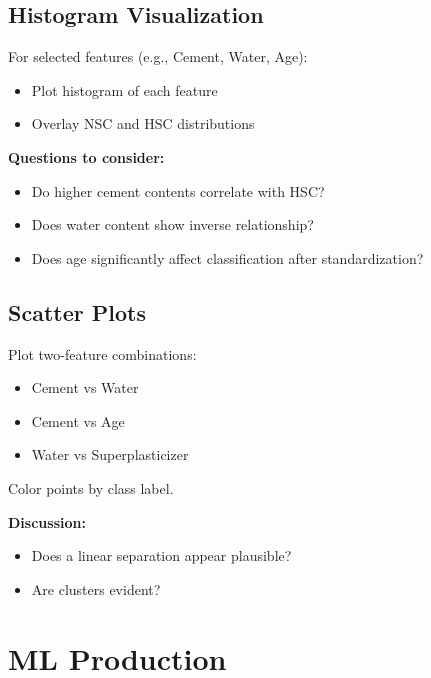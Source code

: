 \documentclass[12pt]{article}
\begin{document}
\subsection*{Histogram Visualization}

For selected features (e.g., Cement, Water, Age):

\begin{itemize}
    \item Plot histogram of each feature
    \item Overlay NSC and HSC distributions
\end{itemize}

\begin{alert-box}{\textbf{Questions to consider:}}
\begin{itemize}
    \item Do higher cement contents correlate with HSC?
    \item Does water content show inverse relationship?
    \item Does age significantly affect classification after standardization?
\end{itemize}
\end{alert-box}

\subsection*{Scatter Plots}

Plot two-feature combinations:

\begin{itemize}
    \item Cement vs Water
    \item Cement vs Age
    \item Water vs Superplasticizer
\end{itemize}

Color points by class label.

\begin{alert-box}{\textbf{Discussion:}}
\begin{itemize}
    \item Does a linear separation appear plausible?
    \item Are clusters evident?
\end{itemize}
\end{alert-box}

\section*{ML Production}
\end{document}
